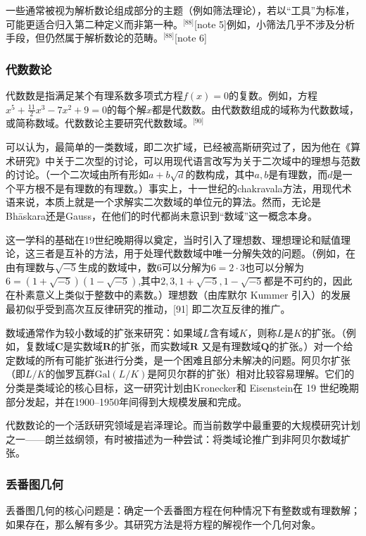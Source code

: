 一些通常被视为解析数论组成部分的主题（例如筛法理论），若以“工具”为标准，可能更适合归入第二种定义而非第一种。\(^\text{[88]}\)[note 5]例如，小筛法几乎不涉及分析手段，但仍然属于解析数论的范畴。\(^\text{[88]}\)[note 6]
\subsubsection{代数数论}
代数数是指满足某个有理系数多项式方程$f(x)=0$的复数。例如，方程$x^{5}+\tfrac{11}{2}x^{3}-7x^{2}+9=0$的每个解$x$都是代数数。由代数数组成的域称为代数数域，或简称数域。代数数论主要研究代数数域。\(^\text{[90]}\)

可以认为，最简单的一类数域，即二次扩域，已经被高斯研究过了，因为他在《算术研究》中关于二次型的讨论，可以用现代语言改写为关于二次域中的理想与范数的讨论。（一个二次域由所有形如$a+b\sqrt{d}$的数构成，其中$a, b$是有理数，而$d$是一个平方根不是有理数的有理数。）事实上，十一世纪的chakravala方法，用现代术语来说，本质上就是一个求解实二次数域的单位元的算法。然而，无论是Bhāskara还是Gauss，在他们的时代都尚未意识到“数域”这一概念本身。

这一学科的基础在19世纪晚期得以奠定，当时引入了理想数、理想理论和赋值理论，这三者是互补的方法，用于处理代数数域中唯一分解失效的问题。（例如，在由有理数与$\sqrt{-5}$生成的数域中，数$6$可以分解为$6 = 2 \cdot 3$也可以分解为$6 = (1+\sqrt{-5})(1-\sqrt{-5})$,其中$2, 3, 1+\sqrt{-5}, 1-\sqrt{-5}$都是不可约的，因此在朴素意义上类似于整数中的素数。）理想数（由库默尔 Kummer 引入）的发展最初似乎受到高次互反律研究的推动，[91] 即二次互反律的推广。

数域通常作为较小数域的扩张来研究：如果域$L$含有域$K$，则称$L$是$K$的扩张。（例如，复数域$\mathbf{C}$是实数域$\mathbf{R}$的扩张，而实数域$\mathbf{R}$ 又是有理数域$\mathbf{Q}$的扩张。）对一个给定数域的所有可能扩张进行分类，是一个困难且部分未解决的问题。阿贝尔扩张（即$L/K$的伽罗瓦群$\mathrm{Gal}(L/K)$是阿贝尔群的扩张）相对比较容易理解。它们的分类是类域论的核心目标，这一研究计划由Kronecker和 Eisenstein在 19 世纪晚期部分发起，并在1900–1950年间得到大规模发展和完成。

代数数论的一个活跃研究领域是岩泽理论。而当前数学中最重要的大规模研究计划之一——朗兰兹纲领，有时被描述为一种尝试：将类域论推广到非阿贝尔数域扩张。
\subsubsection{丢番图几何}
丢番图几何的核心问题是：确定一个丢番图方程在何种情况下有整数或有理数解；如果存在，那么解有多少。其研究方法是将方程的解视作一个几何对象。

